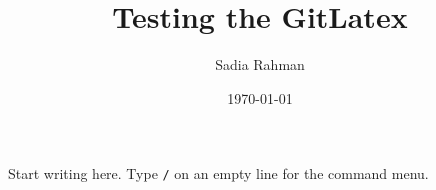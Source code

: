 \documentclass{article}
\title{Testing the GitLatex}
\author{Sadia Rahman}
\date{\today}
\begin{document}
\maketitle

Start writing here. Type \texttt{/} on an empty line for the command menu.
\end{document}

